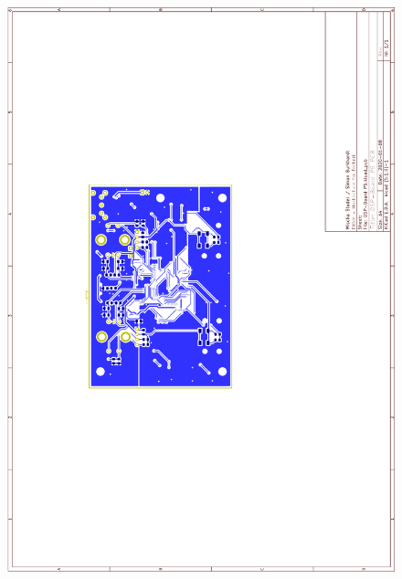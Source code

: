 \begin{appendix}
\begin{figure}[h]
	\centering
	\includegraphics[width=0.95\linewidth]{appendix/DSP-Board-PCB-V1-1(2).pdf}
\end{figure}


\end{appendix}
